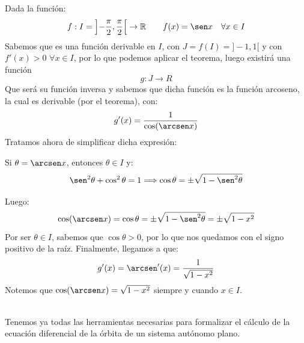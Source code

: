 \begin{ejemplo}
    Dada la función:
    \begin{equation*}
        f:I=\left]-\dfrac{\pi}{2},\dfrac{\pi}{2}\right[ \rightarrow \mathbb{R} \qquad f(x) = \sen x \quad \forall x\in I
    \end{equation*}
    Sabemos que es una función derivable en $I$, con $J=f(I)=]-1,1[$ y con $f'(x) > 0$ $\forall x\in I$, por lo que podemos aplicar el teorema, luego existirá una función
    \begin{equation*}
        g:J\rightarrow R
    \end{equation*}
    Que será su función inversa y sabemos que dicha función es la función arcoseno, la cual es derivable (por el teorema), con:
    \begin{equation*}
        g'(x) = \dfrac{1}{\cos(\arcsen x)}
    \end{equation*}
    Tratamos ahora de simplificar dicha expresión:

    Si $\theta = \arcsen x$, entonces $\theta \in I$ y:
    \begin{equation*}
        \sen^2 \theta + \cos^2 \theta = 1 \Longrightarrow \cos \theta = \pm \sqrt{1-\sen^2 \theta}
    \end{equation*}

    Luego:
    \begin{equation*}
        \cos(\arcsen x) = \cos \theta = \pm \sqrt{1-\sen^2 \theta} = \pm \sqrt{1-x^2}
    \end{equation*}
    Por ser $\theta \in I$, sabemos que $\cos \theta > 0$, por lo que nos quedamos con el signo positivo de la raíz. Finalmente, llegamos a que:
    \begin{equation*}
        g'(x) = \arcsen'(x) = \dfrac{1}{\sqrt{1-x^2}}
    \end{equation*}
    Notemos que $\cos(\arcsen x) = \sqrt{1-x^2}$ siempre y cuando $x\in I$.
\end{ejemplo}~\\

Tenemos ya todas las herramientas necesarias para formalizar el cálculo de la ecuación diferencial de la órbita de un sistema autónomo plano.

